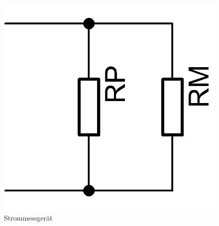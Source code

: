 \begin{frame}
\begin{columns}
\begin{center}
\begin{figure}
        \includegraphics[width=\textwidth,height=.4\textheight,keepaspectratio]{a16/Messbereichserweiterung-Strom.png}
        \caption{Strommessgerät}
      \end{figure}
    \end{center}
  \end{columns}
\end{frame}


